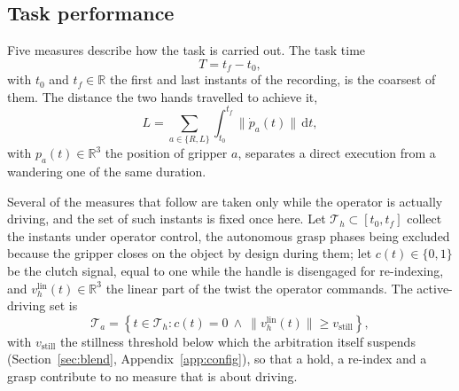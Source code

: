 \subsection{Task performance}
\label{sec:resperf}

Five measures describe how the task is carried out. The task time
\begin{equation}
T = t_f - t_0,
\label{eq:mT}
\end{equation}
with $t_0$ and $t_f \in \mathbb{R}$ the first and last instants of the recording, is the coarsest of them. The distance the two hands travelled to achieve it,
\begin{equation}
L = \sum_{a \in \{R,L\}} \int_{t_0}^{t_f} \lVert \dot{p}_a(t) \rVert \, \mathrm{d}t,
\label{eq:mL}
\end{equation}
with $p_a(t) \in \mathbb{R}^3$ the position of gripper $a$, separates a direct execution from a wandering one of the same duration.

Several of the measures that follow are taken only while the operator is actually driving, and the set of such instants is fixed once here. Let $\mathcal{T}_h \subset [t_0,t_f]$ collect the instants under operator control, the autonomous grasp phases being excluded because the gripper closes on the object by design during them; let $c(t) \in \{0,1\}$ be the clutch signal, equal to one while the handle is disengaged for re-indexing, and $v_h^{\mathrm{lin}}(t) \in \mathbb{R}^3$ the linear part of the twist the operator commands. The active-driving set is
\begin{equation}
\mathcal{T}_a = \left\{ t \in \mathcal{T}_h : c(t) = 0 \ \wedge\ \lVert v_h^{\mathrm{lin}}(t) \rVert \ge v_{\text{still}} \right\},
\label{eq:Ta}
\end{equation}
with $v_{\text{still}}$ the stillness threshold below which the arbitration itself suspends (Section~\ref{sec:blend}, Appendix~\ref{app:config}), so that a hold, a re-index and a grasp contribute to no measure that is about driving.

